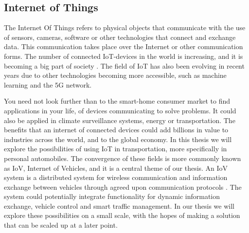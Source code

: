 \subsection{Internet of Things}

The Internet Of Things refers to physical objects that communicate with the use of sensors, cameras, software or other technologies that connect and exchange data. This communication takes place over the Internet or other communication forms. The number of connected IoT-devices in the world is increasing, and it is becoming a big part of society \parencite{iot_analytics}. The field of IoT has also been evolving in recent years due to other technologies becoming more accessible, such as machine learning and the 5G network.

You need not look further than to the smart-home consumer market to find applications in your life, of devices communicating to solve problems. It could also be applied in climate surveillance systems, energy or transportation. The benefits that an internet of connected devices could add billions in value to industries across the world, and to the global economy. In this thesis we will explore the possibilities of using IoT in transportation, more specifically in personal automobiles. The convergence of these fields is more commonly known as IoV, Internet of Vehicles, and it is a central theme of our thesis. An IoV system is a distributed system for wireless communication and information exchange between vehicles through agreed upon communication protocols \parencite{chinese_iov}.  The system could potentially integrate functionality for dynamic information exchange, vehicle control and  smart traffic management. In our thesis we will explore these possibilities on a small scale, with the hopes of making a solution that can be scaled up at a later point. 